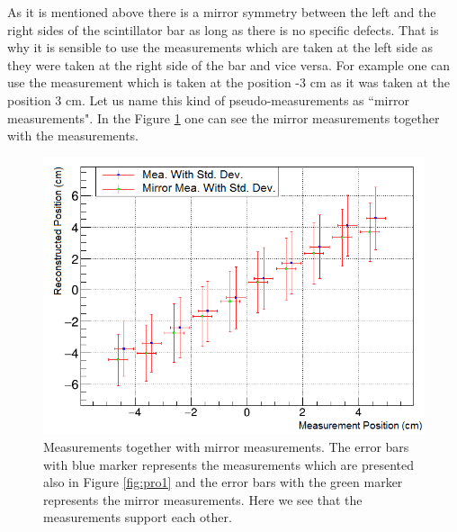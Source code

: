 \documentclass[a4paper]{article}\linespread{1.4}
\begin{document}
As it is mentioned above there is a mirror symmetry between the left and the right sides of the scintillator bar as long as there is no specific defects. 
That is why it is sensible to use the measurements which are taken at the left side as they were taken at the right side of the bar and vice versa. For example one can use the measurement which is taken at the position -3 cm as it was taken at the position 3 cm. Let us name this kind of pseudo-measurements as ``mirror measurements".
In the Figure \ref{fig:pro5} one can see the mirror measurements together with the measurements.\begin{figure}[h!] \hspace*{-0cm} \includegraphics[width=120mm,scale=2.0]{pro5.png} \caption{Measurements together with mirror measurements. The error bars with blue marker represents the measurements which are presented also in Figure \ref{fig:pro1} and the error bars with the green marker represents the mirror measurements. Here we see that the measurements support each other.} \label{fig:pro5}\end{figure}
\end{document}
